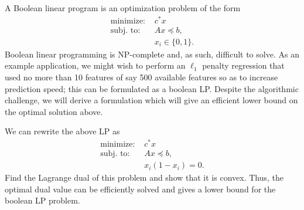 \documentclass[12pt,letterpaper,cm]{hmcpset}
\begin{document}
\begin{problem}[Boyd 5.13]
    A Boolean linear program is an optimization problem of the form
    \begin{align*}
        \text{minimize: } & c^*x\\
        \text{subj. to: } & Ax\preceq b,\\
        & x_i\in\{0,1\}.
    \end{align*}
    Boolean linear programming is NP-complete and, as such, difficult to solve. As an example application, we might wish to perform an $\ell_1$ penalty regression that used no more than 10 features of say 500 available features so as to increase prediction speed; this can be formulated as a boolean LP. Despite the algorithmic challenge, we will derive a formulation which will give an efficient lower bound on the optimal solution above.

    We can rewrite the above LP as
    \begin{align*}
        \text{minimize: } & c^*x\\
        \text{subj. to: } & Ax\preceq b,\\
        & x_i(1-x_i) = 0.
    \end{align*}
    Find the Lagrange dual of this problem and show that it is convex. Thus, the optimal dual value can be efficiently solved and gives a lower bound for the boolean LP problem.
\end{problem}

\begin{solution}
    \vfill
\end{solution}
\end{document}
